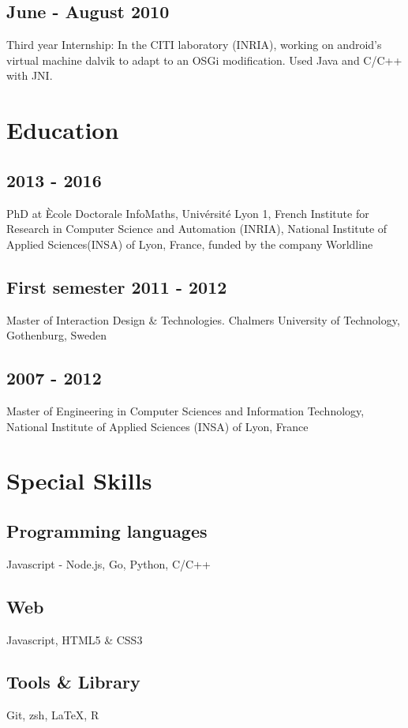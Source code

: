 	\subsection{June - August 2010}
		{Third year Internship: In the CITI laboratory (INRIA), working on android’s virtual machine dalvik to adapt to an OSGi modification. Used Java and C/C++ with JNI.}

\section{Education}
	\subsection{2013 - 2016}
		{PhD at Ècole Doctorale InfoMaths, Univérsité Lyon 1, French Institute for Research in Computer Science and Automation (INRIA), National Institute of Applied Sciences(INSA) of Lyon, France, funded by the company Worldline}

  \subsection{First semester 2011 - 2012}
  	{Master of Interaction Design \& Technologies. Chalmers University of Technology, Gothenburg, Sweden}

	\subsection{2007 - 2012}
		{Master of Engineering in Computer Sciences and Information Technology, National Institute of Applied Sciences (INSA) of Lyon, France}

\eject

\section{Special Skills}
	\subsection{Programming languages}
		{Javascript - Node.js, Go, Python, C/C++}

	\subsection{Web}
		{Javascript, HTML5 \& CSS3}

	\subsection{Tools \& Library}
	  {Git, zsh, \LaTeX, R}

